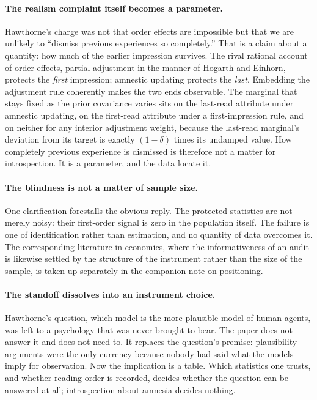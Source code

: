 \documentclass[11pt,a4paper]{article}
\begin{document}
\paragraph{The realism complaint itself becomes a parameter.}
Hawthorne's charge was not that order effects are impossible but that we are
unlikely to ``dismiss previous experiences so completely.'' That is a claim
about a quantity: how much of the earlier impression survives. The rival
rational account of order effects, partial adjustment in the manner of
Hogarth and Einhorn, protects the \emph{first} impression; amnestic updating
protects the \emph{last}. Embedding the adjustment rule coherently makes the
two ends observable. The marginal that stays fixed as the prior covariance
varies sits on the last-read attribute under amnestic updating, on the
first-read attribute under a first-impression rule, and on neither for any
interior adjustment weight, because the last-read marginal's deviation from
its target is exactly $(1-\delta)$ times its undamped value. How completely
previous experience is dismissed is therefore not a matter for introspection.
It is a parameter, and the data locate it.

\paragraph{The blindness is not a matter of sample size.}
One clarification forestalls the obvious reply. The protected statistics are not
merely noisy: their first-order signal is zero in the population itself. The
failure is one of identification rather than estimation, and no quantity of data
overcomes it. The corresponding literature in economics, where the
informativeness of an audit is likewise settled by the structure of the
instrument rather than the size of the sample, is taken up separately in the
companion note on positioning.

\paragraph{The standoff dissolves into an instrument choice.}
Hawthorne's question, which model is the more plausible model of human agents,
was left to a psychology that was never brought to bear. The paper does not
answer it and does not need to. It replaces the question's premise: plausibility
arguments were the only currency because nobody had said what the models imply
for observation. Now the implication is a table. Which statistics one trusts,
and whether reading order is recorded, decides whether the question can be
answered at all; introspection about amnesia decides nothing.
\end{document}

